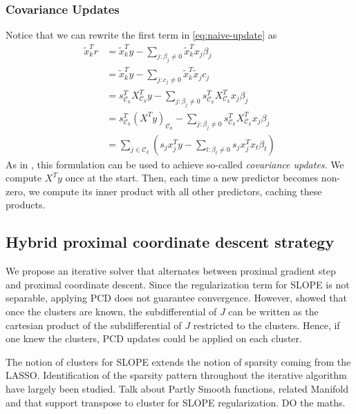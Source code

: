 \subsubsection{Covariance Updates}

Notice that we can rewrite the first term in \eqref{eq:naive-update} as
\begin{equation}
  \begin{aligned}
    \tilde x_k^T r & = \tilde x_k^T y - \sum_{j : \beta_j \neq 0} \tilde x_k^T x_j \beta_j                                                                    \\
                   & = \tilde x_k^T y - \sum_{j : c_j \neq 0} \tilde x_k^T \tilde x_j c_j                                                                     \\
                   & = s_{\mathcal{C}_k}^T X_{\mathcal{C}_k}^T y - \sum_{j : \beta_j \neq 0} s_{\mathcal{C}_k}^T X_{\mathcal{C}_k}^T x_j \beta_j              \\
                   & = s_{\mathcal{C}_k}^T \left(X^T y\right)_{\mathcal{C}_k} - \sum_{j : \beta_j \neq 0} s_{\mathcal{C}_k}^T X_{\mathcal{C}_k}^T x_j \beta_j \\
                   & = \sum_{j \in \mathcal{C}_k}\left( s_j x_j^Ty - \sum_{t : \beta_t \neq 0} s_j x_j^T x_t \beta_t \right)
  \end{aligned}
\end{equation}
As in \textcite{friedman2010}, this formulation can be used to achieve so-called \emph{covariance updates}.
We compute \(X^T y\) once at the start.
Then, each time a new predictor becomes non-zero, we compute its inner product with all other predictors, caching these products.

\subsection{Hybrid proximal coordinate descent strategy}

We propose an iterative solver that alternates between proximal gradient step and proximal coordinate descent.
Since the regularization term for SLOPE is not separable, applying PCD does not guarantee convergence.
However, \cite{dupuis2021} showed that once the clusters are known, the subdifferential of $J$ can be written as the cartesian product of the subdifferential of $J$ restricted to the clusters.
Hence, if one knew the clusters, PCD updates could be applied on each cluster.

The notion of clusters for SLOPE extends the notion of sparsity coming from the LASSO.
Identification of the sparsity pattern throughout the iterative algorithm have largely been studied.
Talk about Partly Smooth functions, related Manifold and that support transpose to cluster for SLOPE regularization. DO the maths.

